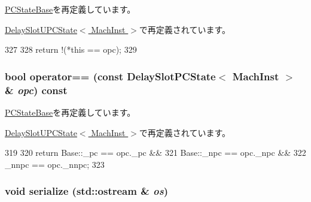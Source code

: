 \hyperlink{classGenericISA_1_1PCStateBase_af9600d6b82659d663fd0c8be2cbef409}{PCStateBase}を再定義しています。

\hyperlink{classGenericISA_1_1DelaySlotUPCState_a62dd495435f7d310779afd1c1a0b42c6}{DelaySlotUPCState$<$ MachInst $>$}で再定義されています。


\begin{DoxyCode}
327     {
328         return !(*this == opc);
329     }
\end{DoxyCode}
\hypertarget{classGenericISA_1_1DelaySlotPCState_ac87333e7d41d689a69647582933c9985}{
\subsubsection[{operator==}]{\setlength{\rightskip}{0pt plus 5cm}bool operator== (const {\bf DelaySlotPCState}$<$ MachInst $>$ \& {\em opc}) const}}
\label{classGenericISA_1_1DelaySlotPCState_ac87333e7d41d689a69647582933c9985}


\hyperlink{classGenericISA_1_1PCStateBase_a8643649fe59176cb0c5e8b48738c36fe}{PCStateBase}を再定義しています。

\hyperlink{classGenericISA_1_1DelaySlotUPCState_a3eaf06cc3c4e66eb1d29bafe9d140a8c}{DelaySlotUPCState$<$ MachInst $>$}で再定義されています。


\begin{DoxyCode}
319     {
320         return Base::_pc == opc._pc &&
321                Base::_npc == opc._npc &&
322                _nnpc == opc._nnpc;
323     }
\end{DoxyCode}
\hypertarget{classGenericISA_1_1DelaySlotPCState_a53e036786d17361be4c7320d39c99b84}{
\subsubsection[{serialize}]{\setlength{\rightskip}{0pt plus 5cm}void serialize (std::ostream \& {\em os})}}
\label{classGenericISA_1_1DelaySlotPCState_a53e036786d17361be4c7320d39c99b84}


